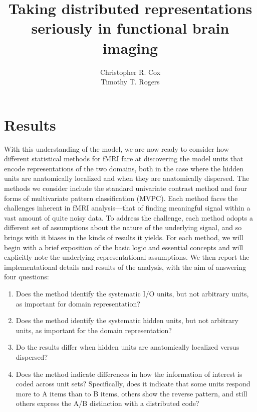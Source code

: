 \documentclass[12pt,man]{apa6}
\title{Taking distributed representations seriously in functional brain imaging}
\author{Christopher R. Cox\\Timothy T. Rogers}
\affiliation{University of Wisconsin, Madison}
\begin{document}
\maketitle







\section{Results}

With this understanding of the model, we are now ready to consider how different statistical methods for fMRI fare at discovering the model units that encode representations of the two domains, both in the case where the hidden units are anatomically localized and when they are anatomically dispersed. The methods we consider include the standard univariate contrast method and four forms of multivariate pattern classification (MVPC). Each method faces the challenges inherent in fMRI analysis---that of finding meaningful signal within a vast amount of quite noisy data. To address the challenge, each method adopts a different set of assumptions about the nature of the underlying signal, and so brings with it biases in the kinds of results it yields. For each method, we will begin with a brief exposition of the basic logic and essential concepts and will explicitly note the underlying representational assumptions. We then report the implementational details and results of the analysis, with the aim of answering four questions:

\begin{enumerate}
\item Does the method identify the systematic I/O units, but not arbitrary units, as important for domain representation?
\item Does the method identify the systematic hidden units, but not arbitrary units, as important for the domain representation?
\item Do the results differ when hidden units are anatomically localized versus dispersed?
\item Does the method indicate differences in how the information of interest is coded across unit sets? Specifically, does it indicate that some units respond more to A items than to B items, others show the reverse pattern, and still others express the A/B distinction with a distributed code? 
\end{enumerate}















%


\end{document}
